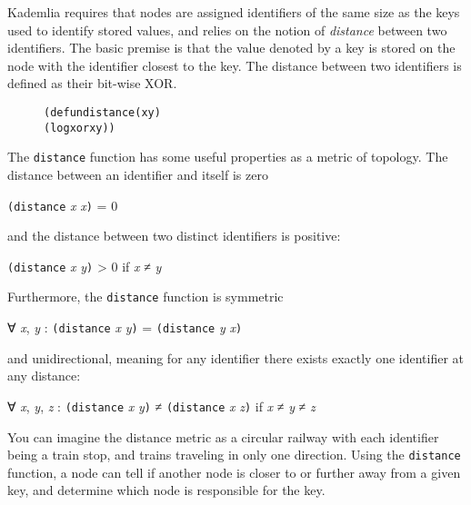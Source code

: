 \documentclass [a4paper,12pt,oneside]{article}\usepackage [paper=a4paper,left=37.5264mm,right=37.5264mm,top=37.5264mm,bottom=37.5264mm]{geometry}\usepackage {graphicx}\usepackage {tabularx}\usepackage {alltt}\usepackage {float}\usepackage [section]{placeins}\usepackage {titling}\setlength {\droptitle }{-4em}\pretitle {\begin {flushright}\bfseries \LARGE }\posttitle {\end {flushright}}\preauthor {\begin {flushright}}\postauthor {\end {flushright}}\predate {\begin {flushright}}\postdate {\end {flushright}}\usepackage [english]{babel}\usepackage [T1]{fontenc}\usepackage [utf8x]{inputenc}\usepackage {stmaryrd}\usepackage {amsfonts}\DeclareUnicodeCharacter {12314}{$\llbracket $}\DeclareUnicodeCharacter {12315}{$\rrbracket $}\DeclareUnicodeCharacter {9655}{$\rhd $}\newcommand \nobreakdash {\mbox {-}}\DeclareUnicodeCharacter {8209}{\nobreakdash }\usepackage [sc]{mathpazo}\linespread {1.05}\usepackage [font={small},labelformat=empty,labelsep=none]{caption}\tolerance=10000 \clubpenalty=10000 \widowpenalty=10000 \frenchspacing
\begin{document}
Kademlia requires that nodes are assigned identifiers of the same size as the keys used to identify stored values, and relies on the notion of \textit {distance} between two identifiers. The basic premise is that the value denoted by a key is stored on the node with the identifier closest to the key. The distance between two identifiers is defined as their bit-wise XOR.

\begin {figure}[H]\centering \begin {alltt}
(defun distance (x y)
  (logxor x y))
\end{alltt}\vspace {-1em}\end {figure}

\medskip 

\noindent The \texttt {distance} function has some useful properties as a metric of topology. The distance between an identifier and itself is zero

\medskip \medskip 

\noindent \texttt {(distance} \textit {x} \textit {x}\texttt {)} = 0

\medskip \medskip 

\noindent and the distance between two distinct identifiers is positive:

\medskip \medskip 

\noindent \texttt {(distance} \textit {x} \textit {y}\texttt {)} > 0 if \textit {x} ≠ \textit {y}

\medskip \medskip 

\noindent Furthermore, the \texttt {distance} function is symmetric

\medskip \medskip 

\noindent ∀ \textit {x}, \textit {y} : \texttt {(distance} \textit {x} \textit {y}\texttt {)} = \texttt {(distance} \textit {y} \textit {x}\texttt {)}

\medskip \medskip 

\noindent and unidirectional, meaning for any identifier there exists exactly one identifier at any distance:

\medskip \medskip 

\noindent ∀ \textit {x}, \textit {y}, \textit {z} : \texttt {(distance} \textit {x} \textit {y}\texttt {)} ≠ \texttt {(distance} \textit {x} \textit {z}\texttt {)} if \textit {x} ≠ \textit {y} ≠ \textit {z}

\medskip You can imagine the distance metric as a circular railway with each identifier being a train stop, and trains traveling in only one direction. Using the \texttt {distance} function, a node can tell if another node is closer to or further away from a given key, and determine which node is responsible for the key.
\end{document}
